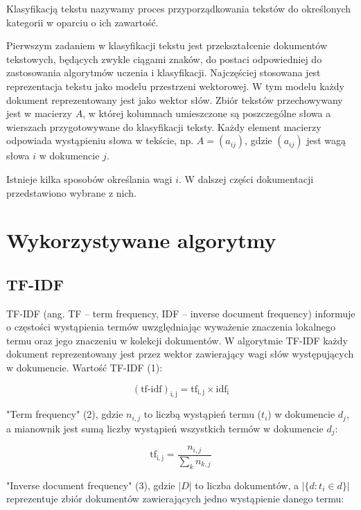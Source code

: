 \documentclass[a4paper, 10pt]{article}
\begin{document}
Klasyfikacją tekstu nazywamy proces przyporządkowania tekstów do określonych kategorii w oparciu o ich zawartość. 

Pierwszym zadaniem w klasyfikacji tekstu jest przekształcenie dokumentów tekstowych, będących zwykle ciągami znaków, do postaci odpowiedniej do zastosowania algorytmów uczenia i klasyfikacji.
Najczęściej stosowana jest reprezentacja tekstu jako modelu przestrzeni wektorowej. W tym modelu każdy dokument reprezentowany jest jako wektor słów. Zbiór tekstów przechowywany jest w macierzy ${A}$, w której kolumnach umieszczone są poszczególne słowa a wierszach przygotowywane do klasyfikacji teksty. Każdy element macierzy odpowiada wystąpieniu słowa w tekście, np. ${A = (a_{ij})}$, gdzie $(a_{ij})$ jest wagą słowa $i$ w dokumencie $j$. 

Istnieje kilka sposobów określania wagi $i$. W dalszej części dokumentacji przedstawiono wybrane z nich.

\section{Wykorzystywane algorytmy}

\subsection{TF-IDF}

TF-IDF (ang. TF – term frequency, IDF – inverse document frequency) informuje o częstości wystąpienia termów uwzględniając 
wyważenie znaczenia lokalnego termu oraz jego znaczeniu w kolekcji dokumentów. W algorytmie TF-IDF każdy dokument reprezentowany
jest przez wektor zawierający wagi słów występujących w dokumencie. Wartość TF-IDF (1):


\begin{equation}
\mathrm{(tf\mbox{-}idf)_{i,j}} = \mathrm{tf_{i,j}} \times  \mathrm{idf_{i}}
\end{equation}

"Term frequency" (2), gdzie $n_{i,j}$ to liczbą wystąpień termu ($t_{i}$) w dokumencie $d_{j}$, a mianownik jest sumą liczby wystąpień wszystkich termów w dokumencie $d_{j}$:
 
\begin{equation}
\mathrm{tf_{i,j}} = \frac{n_{i,j}}{\sum_k n_{k,j}}
\end{equation}

"Inverse document frequency" (3), gdzie $|D|$ to liczba dokumentów, a $|\{d : t_{i} \in d\}|$ reprezentuje zbiór dokumentów zawierających
jedno wystąpienie danego termu:
\end{document}
